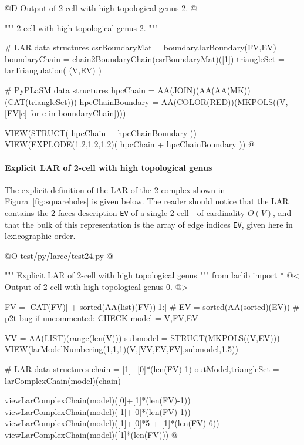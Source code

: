 \documentclass[11pt,oneside]{article}    %
\begin{document}
@D Output of 2-cell with high topological genus 2.
@{""" 2-cell with high topological genus 2. """

# LAR data structures
csrBoundaryMat = boundary.larBoundary(FV,EV)
boundaryChain = chain2BoundaryChain(csrBoundaryMat)([1])
triangleSet = larTriangulation( (V,EV) )

# PyPLaSM data structures
hpcChain = AA(JOIN)(AA(AA(MK))(CAT(triangleSet)))
hpcChainBoundary = AA(COLOR(RED))(MKPOLS((V,[EV[e] for e in boundaryChain])))

VIEW(STRUCT( hpcChain + hpcChainBoundary ))
VIEW(EXPLODE(1.2,1.2,1.2)( hpcChain + hpcChainBoundary ))
@}

\paragraph{Explicit LAR of 2-cell with high topological genus}

The explicit definition of the LAR of the 2-complex shown in Figura~\ref{fig:squareholes} is given below. The reader should notice that the LAR contains the 2-faces description \texttt{EV} of a single 2-cell---of cardinality $O(V)$, and that the bulk of this representation is the array of edge indices \texttt{EV}, given here in lexicographic order.

@O test/py/larcc/test24.py
@{""" Explicit LAR of 2-cell with high topological genus """
from larlib import *
@< Output of 2-cell with high topological genus 0. @>

FV = [CAT(FV)] + sorted(AA(list)(FV))[1:]
# EV = sorted(AA(sorted)(EV))  # p2t bug if uncommented: CHECK
model = V,FV,EV

VV = AA(LIST)(range(len(V)))
submodel = STRUCT(MKPOLS((V,EV)))
VIEW(larModelNumbering(1,1,1)(V,[VV,EV,FV],submodel,1.5)) 

# LAR data structures
chain = [1]+[0]*(len(FV)-1)
outModel,triangleSet = larComplexChain(model)(chain)

viewLarComplexChain(model)([0]+[1]*(len(FV)-1))
viewLarComplexChain(model)([1]+[0]*(len(FV)-1))
viewLarComplexChain(model)([1]+[0]*5 + [1]*(len(FV)-6))
viewLarComplexChain(model)([1]*(len(FV)))
@}
\end{document}
